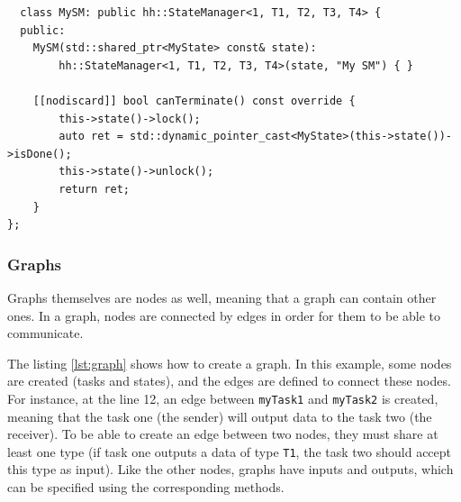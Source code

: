 \begin{listing}[ht!]
\begin{verbatim}
  class MySM: public hh::StateManager<1, T1, T2, T3, T4> {
  public:
    MySM(std::shared_ptr<MyState> const& state):
        hh::StateManager<1, T1, T2, T3, T4>(state, "My SM") { }

    [[nodiscard]] bool canTerminate() const override {
        this->state()->lock();
        auto ret = std::dynamic_pointer_cast<MyState>(this->state())->isDone();
        this->state()->unlock();
        return ret;
    }
};
\end{verbatim}
\label{lst:statemanager}
\end{listing}

\subsubsection{Graphs}

Graphs themselves are nodes as well, meaning that a graph can contain other
ones. In a graph, nodes are connected by edges in order for them to be able to
communicate.

The listing \ref{lst:graph} shows how to create a graph. In this example, some
nodes are created (tasks and states), and the edges are defined to connect these
nodes. For instance, at the line 12, an edge between \texttt{myTask1}
and \texttt{myTask2} is created, meaning that the task one (the sender) will output
data to the task two (the receiver). To be able to create an edge between two
nodes, they must share at least one type (if task one outputs a data of type
\texttt{T1}, the task two should accept this type as input). Like the other
nodes, graphs have inputs and outputs, which can be specified using the
corresponding methods.

